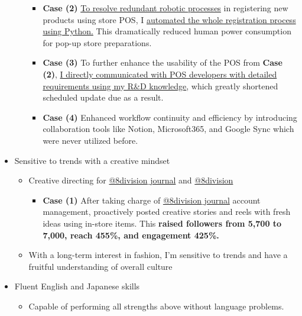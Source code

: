 \documentclass[a4paper,10pt]{extarticle}
\begin{document}
\begin{itemize}
\begin{itemize}
\begin{itemize}
                        \item \textbf{Case (2)} \ul{To resolve redundant robotic processes} in registering new products using store POS, I \ul{automated the whole registration process using Python.} This dramatically reduced human power consumption for pop-up store preparations.
                        \item \textbf{Case (3)} To further enhance the usability of the POS from \textbf{Case (2)}, \ul{I directly communicated with POS developers with detailed requirements using my R\&D knowledge}, which greatly shortened scheduled update due as a result.
                        \item \textbf{Case (4)} Enhanced workflow continuity and efficiency by introducing collaboration tools like Notion, Microsoft365, and Google Sync which were never utilized before.
                    \end{itemize}
          \end{itemize}
    \item Sensitive to trends with a creative mindset
          \begin{itemize}
              \item Creative directing for \href{https://instagram.com/8division_journal}{@8division$\_$journal} and \href{https://instagram.com/8division}{@8division}
                    \begin{itemize}
                        \item \textbf{Case (1)} After taking charge of \href{https://instagram.com/8division_journal}{@8division$\_$journal} account management, proactively posted creative stories and reels with fresh ideas using in-store items. This \textbf{raised followers from 5,700 to 7,000, reach 455\%, and engagement 425\%.}
                    \end{itemize}
              \item With a long-term interest in fashion, I'm sensitive to trends and have a fruitful understanding of overall culture
          \end{itemize}
    \item Fluent English and Japanese skills
          \begin{itemize}
              \item Capable of performing all strengths above without language problems.
          \end{itemize}
\end{itemize}
\end{document}
